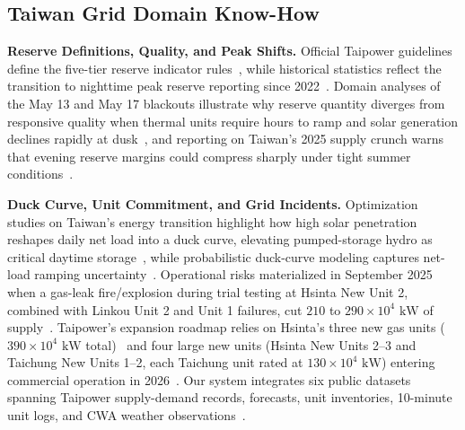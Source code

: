 \documentclass[conference]{IEEEtran}
\begin{document}
\subsection{Taiwan Grid Domain Know-How}
\label{sec:related_domain}

\textbf{Reserve Definitions, Quality, and Peak Shifts.} Official Taipower guidelines define the five-tier reserve indicator rules~\cite{ref11}, while historical statistics reflect the transition to nighttime peak reserve reporting since 2022~\cite{ref4}. Domain analyses of the May 13 and May 17 blackouts illustrate why reserve quantity diverges from responsive quality when thermal units require hours to ramp and solar generation declines rapidly at dusk~\cite{ref14}, and reporting on Taiwan's 2025 supply crunch warns that evening reserve margins could compress sharply under tight summer conditions~\cite{ref15}.

\textbf{Duck Curve, Unit Commitment, and Grid Incidents.} Optimization studies on Taiwan's energy transition highlight how high solar penetration reshapes daily net load into a duck curve, elevating pumped-storage hydro as critical daytime storage~\cite{ref28}, while probabilistic duck-curve modeling captures net-load ramping uncertainty~\cite{ref29}. Operational risks materialized in September 2025 when a gas-leak fire/explosion during trial testing at Hsinta New Unit 2, combined with Linkou Unit 2 and Unit 1 failures, cut $210$ to $290 \times 10^4\text{ kW}$ of supply~\cite{ref10,ref12,ref13}. Taipower's expansion roadmap relies on Hsinta's three new gas units ($390 \times 10^4\text{ kW}$ total)~\cite{ref18} and four large new units (Hsinta New Units 2--3 and Taichung New Units 1--2, each Taichung unit rated at $130 \times 10^4\text{ kW}$) entering commercial operation in 2026~\cite{ref19,ref31}. Our system integrates six public datasets spanning Taipower supply-demand records, forecasts, unit inventories, 10-minute unit logs, and CWA weather observations~\cite{ref1,ref2,ref3,ref4,ref5,ref6,ref30}.
\end{document}
